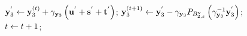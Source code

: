 \begin{figure}[!t]
\begin{algorithm}[H]
\begin{algorithmic}[1]
    			\STATE $\mathbf{y}_{3}^{'} \leftarrow \mathbf{y}_{3}^{(t)} + \gamma_{\mathbf{y}_{3}} \left( \mathbf{u}^{'} + \mathbf{s}^{'} + \mathbf{t}^{'} \right)$;
    			\STATE $\mathbf{y}_{3}^{(t+1)} \leftarrow \mathbf{y}_{3}^{'} - \gamma_{\mathbf{y}_{3}} P_{B_{2, \varepsilon}^{\mathbf{v}}} \left(\gamma_{\mathbf{y}_{3}}^{-1} \mathbf{y}_{3}^{'}  \right)$;
    			\STATE $t \leftarrow t + 1$;
			\ENDWHILE
		\end{algorithmic}
	\end{algorithm}
	\vspace{-2mm}
\end{figure}